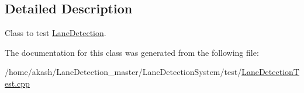 \subsection{Detailed Description}
Class to test \hyperlink{classLaneDetection}{Lane\+Detection}. 

The documentation for this class was generated from the following file\+:\begin{DoxyCompactItemize}
\item 
/home/akash/\+Lane\+Detection\+\_\+master/\+Lane\+Detection\+System/test/\hyperlink{LaneDetectionTest_8cpp}{Lane\+Detection\+Test.\+cpp}\end{DoxyCompactItemize}
